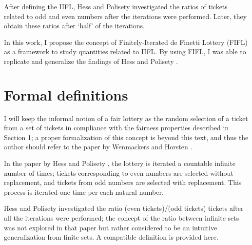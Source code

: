 \documentclass{article}
\newcommand{\ppar}[1]{\left( #1 \right)}
\begin{document}
After defining the IIFL, Hess and Polisety \cite{hess2023} investigated the ratios of tickets related to odd and even numbers after the iterations were performed.
%
Later, they obtain these ratios after `half' of the iterations.

In this work, I propose the concept of Finitely-Iterated de Finetti Lottery (FIFL) as a framework to study quantities related to IIFL.
%
By using FIFL, I was able to replicate and generalize the findings of Hess and Polisety \cite{hess2023}.


\section{Formal definitions}

I will keep the informal notion of a fair lottery as the random selection of a ticket from a set of tickets in compliance with the fairness properties described in Section 1;
%
a proper formalization of this concept is beyond this text, and thus the author should refer to the paper by Wenmackers and Horsten \cite{fair_infinite_lottery}.

%
%

In the paper by Hess and Polisety \cite{hess2023}, the lottery is iterated a countable infinite number of times; tickets corresponding to even numbers are selected without replacement, and tickets from odd numbers are selected with replacement.
%
This process is iterated one time per each natural number.

Hess and Polisety investigated the ratio (even tickets)/(odd tickets) tickets after all the iterations were performed;
%
the concept of the ratio between infinite sets was not explored in that paper but rather considered to be an intuitive generalization from finite sets.
%
A compatible definition is provided here.
\end{document}

